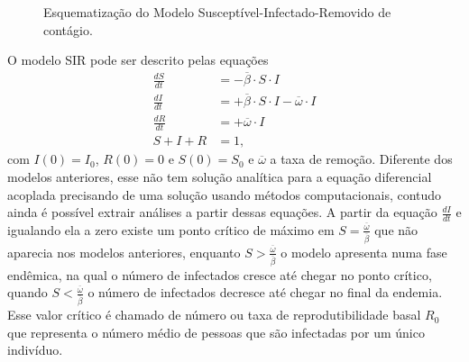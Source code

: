 \begin{figure}[ht]
  \centering
  \captionsetup{font=normalsize,skip=0.8pt,singlelinecheck=on,labelsep=endash}
  \caption{Esquematização do Modelo Susceptível-Infectado-Removido de contágio.} 
  \label{img:SIR_}
\end{figure}

O modelo SIR pode ser descrito pelas equações
\begin{align}
\frac{dS}{dt} &= -\overline{\beta} \cdot S \cdot I\\
\frac{dI}{dt} &= +\overline{\beta} \cdot S \cdot I- \overline{\omega} \cdot I\\
\frac{dR}{dt} &= +\overline{\omega} \cdot I\\
S +I+ R &= 1,
\label{SIR}
\end{align}
com $I(0) = I_0$, $R(0) = 0$ e $S(0) = S_0$ e $\overline{\omega}$ a taxa de remoção. Diferente dos modelos anteriores, esse não tem solução analítica para a equação diferencial acoplada precisando de uma solução usando métodos computacionais, contudo ainda é possível extrair análises a partir dessas equações. A partir da equação $\frac{dI}{dt}$ e igualando ela a zero existe um ponto crítico de máximo em $S = \frac{\overline{\omega}}{\overline{\beta}}$ que não aparecia nos modelos anteriores, enquanto $S > \frac{\overline{\omega}}{\overline{\beta}}$ o modelo apresenta numa fase endêmica, na qual o número de infectados cresce até chegar no ponto crítico, quando $S < \frac{\overline{\omega}}{\overline{\beta}}$ o número de infectados decresce até chegar no final da endemia. Esse valor crítico é chamado de número ou taxa de reprodutibilidade basal $R_0$ que representa o número médio de pessoas que são infectadas por um único indivíduo. 

